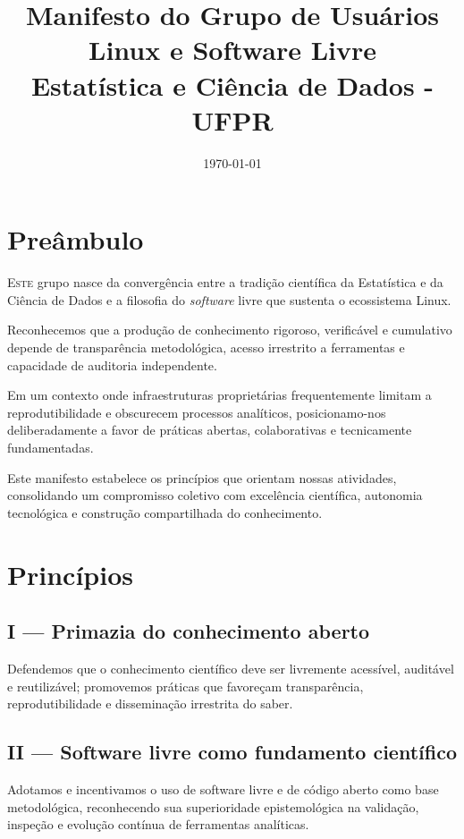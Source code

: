 \documentclass[
  12pt,          %
  a4paper,       %
  oneside,       %
  brazil         %
]{article}
\title{Manifesto do Grupo de Usuários Linux e Software Livre\\Estatística e Ciência de Dados - UFPR}
\date{\today}
\newenvironment{principio}[1]{%
  \vspace{0.8em}
  \noindent
  \begin{minipage}{\textwidth}
    \subsection*{#1}
    \itshape
}{%
  \end{minipage}
  \vspace{0.5em}
}
\begin{document}
\thispagestyle{empty}
\maketitle

\newpage

\section*{Preâmbulo}

\lettrine[lines=3, lhang=0.1, nindent=0em, slope=-0.5em]{E}{ste} grupo nasce da convergência entre a tradição científica da Estatística e da 
Ciência de Dados e a filosofia do \textit{software} livre que sustenta o ecossistema Linux.

Reconhecemos que a produção de conhecimento rigoroso, verificável e cumulativo depende de transparência metodológica, acesso irrestrito a 
ferramentas e capacidade de auditoria independente.

Em um contexto onde infraestruturas proprietárias frequentemente limitam a reprodutibilidade e obscurecem processos analíticos, 
posicionamo-nos deliberadamente a favor de práticas abertas, colaborativas e tecnicamente fundamentadas.

Este manifesto estabelece os princípios que orientam nossas atividades, consolidando um compromisso coletivo com excelência científica, 
autonomia tecnológica e construção compartilhada do conhecimento.

\section*{Princípios}

\begin{principio}{I --- Primazia do conhecimento aberto}
Defendemos que o conhecimento científico deve ser livremente acessível, auditável e reutilizável; promovemos práticas que favoreçam 
transparência, reprodutibilidade e disseminação irrestrita do saber.
\end{principio}

\begin{principio}{II --- Software livre como fundamento científico}
Adotamos e incentivamos o uso de software livre e de código aberto como base metodológica, reconhecendo sua superioridade epistemológica na 
validação, inspeção e evolução contínua de ferramentas analíticas.
\end{principio}
\end{document}
